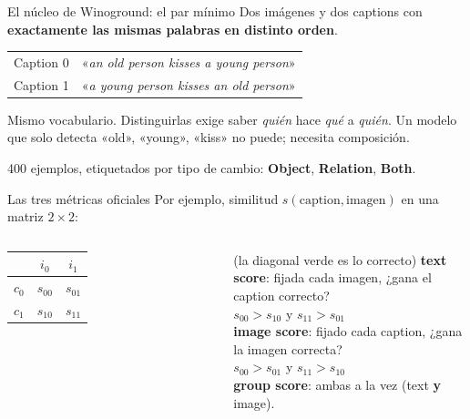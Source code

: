 \documentclass[aspectratio=169]{beamer}
\begin{document}
\begin{frame}{El núcleo de Winoground: el par mínimo}
  Dos imágenes y dos captions con \textbf{exactamente las mismas palabras en distinto orden}.
  \begin{center}
  \begin{tabular}{ll}
    \toprule
    Caption 0 & «\textit{an old person kisses a young person}» \\
    Caption 1 & «\textit{a young person kisses an old person}» \\
    \bottomrule
  \end{tabular}
  \end{center}
  \footnotesize Mismo vocabulario. Distinguirlas exige saber \emph{quién} hace \emph{qué} a \emph{quién}.
  Un modelo que solo detecta «old», «young», «kiss» no puede; necesita composición.
  \par\vspace{0.5em}
  400 ejemplos, etiquetados por tipo de cambio: \textbf{Object}, \textbf{Relation}, \textbf{Both}.
\end{frame}

\begin{frame}{Las tres métricas oficiales}
  Por ejemplo, similitud $s(\text{caption}, \text{imagen})$ en una matriz $2\times2$:
  \begin{columns}[T]
    \centering
    \begin{tabular}{c|cc}
        & $i_0$ & $i_1$ \\\hline
      $c_0$ & \textbf{\color{verde}$s_{00}$} & $s_{01}$ \\
      $c_1$ & $s_{10}$ & \textbf{\color{verde}$s_{11}$} \\
    \end{tabular}
    \par\footnotesize (la diagonal verde es lo correcto)
    \footnotesize
    \textbf{text score}: fijada cada imagen, ¿gana el caption correcto?\\
    $s_{00}>s_{10}$ y $s_{11}>s_{01}$\\[4pt]
    \textbf{image score}: fijado cada caption, ¿gana la imagen correcta?\\
    $s_{00}>s_{01}$ y $s_{11}>s_{10}$\\[4pt]
    \textbf{group score}: ambas a la vez (text \textbf{y} image).
  \end{columns}
\end{frame}
\end{document}
